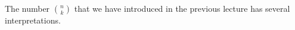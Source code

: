 

\setcounter{section}{3}
\setcounter{subsection}{0}
\setcounter{dfn}{0}

The number $\binom{n}{k}$ that we have introduced in the previous lecture has several interpretations.


